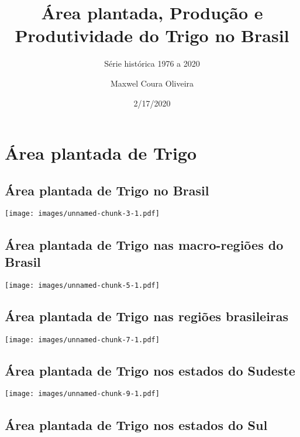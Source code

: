 \documentclass[
]{article}
\title{Área plantada, Produção e Produtividade do Trigo no Brasil}
\subtitle{Série histórica 1976 a 2020}
\author{Maxwel Coura Oliveira}
\date{2/17/2020}
\begin{document}
\maketitle

{
\setcounter{tocdepth}{2}
\tableofcontents
}
\hypertarget{uxe1rea-plantada-de-trigo}{%
\section{Área plantada de Trigo}\label{uxe1rea-plantada-de-trigo}}

\hypertarget{uxe1rea-plantada-de-trigo-no-brasil}{%
\subsection{Área plantada de Trigo no
Brasil}\label{uxe1rea-plantada-de-trigo-no-brasil}}

\texttt{[image: images/unnamed-chunk-3-1.pdf]}

\hypertarget{uxe1rea-plantada-de-trigo-nas-macro-regiuxf5es-do-brasil}{%
\subsection{Área plantada de Trigo nas macro-regiões do
Brasil}\label{uxe1rea-plantada-de-trigo-nas-macro-regiuxf5es-do-brasil}}

\texttt{[image: images/unnamed-chunk-5-1.pdf]}

\hypertarget{uxe1rea-plantada-de-trigo-nas-regiuxf5es-brasileiras}{%
\subsection{Área plantada de Trigo nas regiões
brasileiras}\label{uxe1rea-plantada-de-trigo-nas-regiuxf5es-brasileiras}}

\texttt{[image: images/unnamed-chunk-7-1.pdf]}

\hypertarget{uxe1rea-plantada-de-trigo-nos-estados-do-sudeste}{%
\subsection{Área plantada de Trigo nos estados do
Sudeste}\label{uxe1rea-plantada-de-trigo-nos-estados-do-sudeste}}

\texttt{[image: images/unnamed-chunk-9-1.pdf]}

\hypertarget{uxe1rea-plantada-de-trigo-nos-estados-do-sul}{%
\subsection{Área plantada de Trigo nos estados do
Sul}\label{uxe1rea-plantada-de-trigo-nos-estados-do-sul}}
\end{document}
